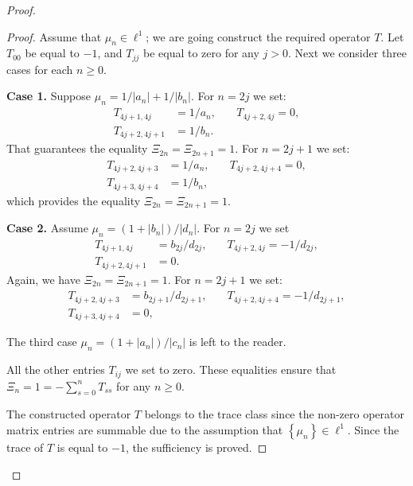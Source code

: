 \begin{proof}
\begin{proof}
        Assume that $\mu_n \in \ell^1$; we are going construct the required operator $T$.
        Let $T_{00}$ be equal to $-1$, and $T_{jj}$ be equal to zero for any $j > 0$.
        Next we consider three cases for each $n \geq 0$.

        \noindent\textbf{Case 1.}
        Suppose $\mu_n = 1/|a_n| + 1/|b_n|$.
        For $n=2j$ we set:
        \begin{align*}
          T_{4j+1,4j}&=1/a_n, & \quad T_{4j+2,4j} = 0,\\
          T_{4j+2,4j+1}&=1/b_n.
        \end{align*}
        That guarantees the equality $\Xi_{2n} = \Xi_{2n+1} = 1$.
        For $n=2j+1$ we set:
        \begin{align*}
          T_{4j+2,4j+3}&=1/a_n, & \quad T_{4j+2,4j+4} = 0,\\
          T_{4j+3,4j+4}&=1/b_n,
        \end{align*}
        which provides the equality $\Xi_{2n} = \Xi_{2n+1} = 1$.

        \noindent\textbf{Case 2.}
        Assume $\mu_n = (1 + |b_n|)/|d_n|$.
        For $n=2j$ we set
        \begin{align*}
          T_{4j+1,4j} &= b_{2j}/d_{2j}, & \quad T_{4j+2,4j} = -1/d_{2j},\\
          T_{4j+2,4j+1} &= 0.
        \end{align*}
        Again, we have $\Xi_{2n} = \Xi_{2n+1} = 1$.
        For $n = 2j + 1$ we set:
        \begin{align*}
          T_{4j+2,4j+3}&=b_{2j+1}/d_{2j+1}, & \quad T_{4j+2,4j+4} = -1/d_{2j+1},\\
          T_{4j+3,4j+4}&=0,
        \end{align*}

        The third case $\mu_n = (1 + |a_n|)/|c_n|$ is left to the reader.
        \medskip

        All the other entries $T_{ij}$ we set to zero.
        These equalities ensure that $\Xi_n = 1 = -\sum_{s=0}^n T_{ss}$ for any $n \geq 0$.

        The constructed operator $T$ belongs to the trace class since the non-zero operator matrix entries are summable
          due to the assumption that $\left\{\mu_n\right\} \in \ell^1$.
        Since the trace of $T$ is equal to $-1$, the sufficiency is proved.


\end{proof}
\end{proof}
